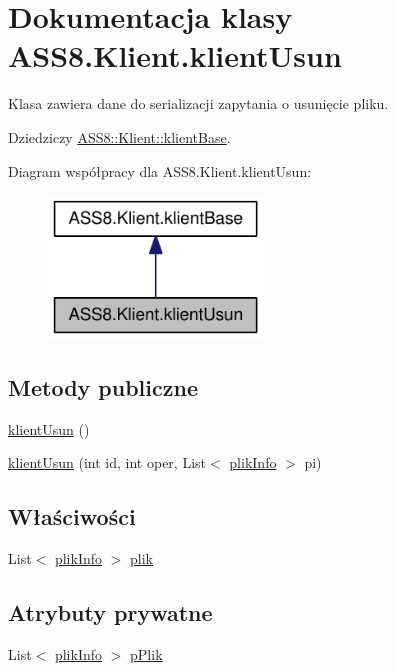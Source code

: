 \hypertarget{a00012}{
\section{Dokumentacja klasy ASS8.Klient.klientUsun}
\label{df/d86/a00012}
}
Klasa zawiera dane do serializacji zapytania o usunięcie pliku.  


Dziedziczy \hyperlink{a00007}{ASS8::Klient::klientBase}.

Diagram współpracy dla ASS8.Klient.klientUsun:\nopagebreak
\begin{figure}[H]
\begin{center}
\leavevmode
\includegraphics[width=162pt]{d1/d72/a00204}
\end{center}
\end{figure}
\subsection*{Metody publiczne}
\begin{CompactItemize}
\item 
\hyperlink{a00012_b199284c747db6951ae55f6276bb80f3}{klientUsun} ()
\item 
\hyperlink{a00012_deeafd41f76b7ec30ef021354ea80cb8}{klientUsun} (int id, int oper, List$<$ \hyperlink{a00018}{plikInfo} $>$ pi)
\end{CompactItemize}
\subsection*{Właściwości}
\begin{CompactItemize}
\item 
List$<$ \hyperlink{a00018}{plikInfo} $>$ \hyperlink{a00012_65f1c0b67462c058fc083489a442d824}{plik}
\end{CompactItemize}
\subsection*{Atrybuty prywatne}
\begin{CompactItemize}
\item 
List$<$ \hyperlink{a00018}{plikInfo} $>$ \hyperlink{a00012_c82991917146a9f234484a6b3e5ad685}{pPlik}
\end{CompactItemize}


